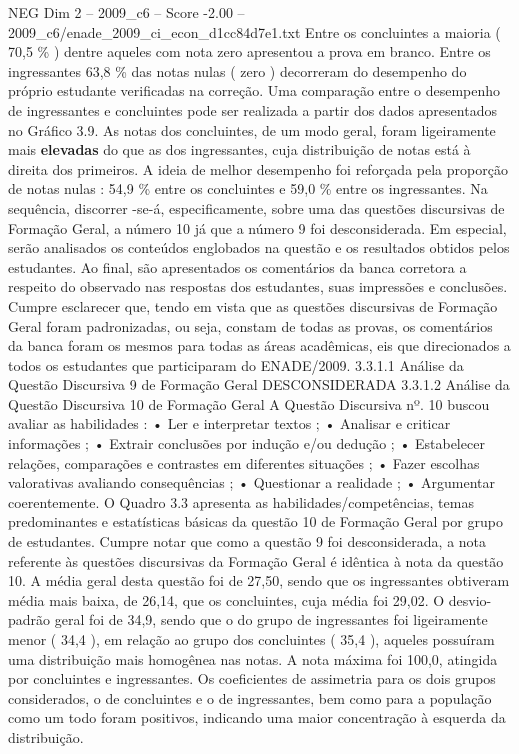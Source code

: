 \begin{textsample}{NEG Dim 2 – 2009\_c6 – Score -2.00 – 2009\_c6/enade\_2009\_ci\_econ\_d1cc84d7e1.txt}
Entre os concluintes a maioria ( 70,5 \% ) dentre aqueles com nota zero apresentou a prova em branco.
Entre os ingressantes 63,8 \% das notas nulas ( zero ) decorreram do desempenho do próprio estudante verificadas na correção.
Uma comparação entre o desempenho de ingressantes e concluintes pode ser realizada a partir dos dados apresentados no Gráfico 3.9.
As notas dos concluintes, de um modo geral, foram ligeiramente mais \textbf{elevadas} do que as dos ingressantes, cuja distribuição de notas está à direita dos primeiros.
A ideia de melhor desempenho foi reforçada pela proporção de notas nulas : 54,9 \% entre os concluintes e 59,0 \% entre os ingressantes.
Na sequência, discorrer -se-á, especificamente, sobre uma das questões discursivas de Formação Geral, a número 10 já que a número 9 foi desconsiderada.
Em especial, serão analisados os conteúdos englobados na questão e os resultados obtidos pelos estudantes.
Ao final, são apresentados os comentários da banca corretora a respeito do observado nas respostas dos estudantes, suas impressões e conclusões.
Cumpre esclarecer que, tendo em vista que as questões discursivas de Formação Geral foram padronizadas, ou seja, constam de todas as provas, os comentários da banca foram os mesmos para todas as áreas acadêmicas, eis que direcionados a todos os estudantes que participaram do ENADE/2009. 3.3.1.1 Análise da Questão Discursiva 9 de Formação Geral DESCONSIDERADA 3.3.1.2 Análise da Questão Discursiva 10 de Formação Geral A Questão Discursiva nº. 10 buscou avaliar as habilidades : • Ler e interpretar textos ; • Analisar e criticar informações ; • Extrair conclusões por indução e/ou dedução ; • Estabelecer relações, comparações e contrastes em diferentes situações ; • Fazer escolhas valorativas avaliando consequências ; • Questionar a realidade ; • Argumentar coerentemente.
O Quadro 3.3 apresenta as habilidades/competências, temas predominantes e estatísticas básicas da questão 10 de Formação Geral por grupo de estudantes.
Cumpre notar que como a questão 9 foi desconsiderada, a nota referente às questões discursivas da Formação Geral é idêntica à nota da questão 10.
A média geral desta questão foi de 27,50, sendo que os ingressantes obtiveram média mais baixa, de 26,14, que os concluintes, cuja média foi 29,02.
O desvio-padrão geral foi de 34,9, sendo que o do grupo de ingressantes foi ligeiramente menor ( 34,4 ), em relação ao grupo dos concluintes ( 35,4 ), aqueles possuíram uma distribuição mais homogênea nas notas.
A nota máxima foi 100,0, atingida por concluintes e ingressantes.
Os coeficientes de assimetria para os dois grupos considerados, o de concluintes e o de ingressantes, bem como para a população como um todo foram positivos, indicando uma maior concentração à esquerda da distribuição.

\end{textsample}
